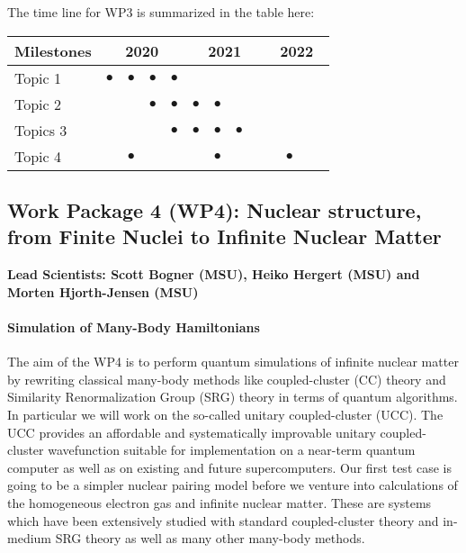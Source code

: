 \documentclass[10pt]{article}
\begin{document}
The time line for WP3 is summarized in the table here:
\begin{footnotesize}
\begin{center}
\begin{tabular}{|l|c|c|c|c|c|c|c|c|c|c|c|c|}
\hline
\multicolumn{1}{|l}{Milestones } & \multicolumn{4}{|c|}{ 2020 } & \multicolumn{4}{c|}{ 2021 } & \multicolumn{4}{c|}{ 2022 } \\
\hline
Topic 1 &$\bullet$ &$\bullet$ &$\bullet$ &$\bullet$ & & & & & & & &  \\
\hline
Topic 2 & & &$\bullet$ &$\bullet$ &$\bullet$ &$\bullet$ & & & & & &  \\
\hline
Topics 3 & & & & $\bullet$ &$\bullet$ &$\bullet$ &$\bullet$ & & & & &  \\
\hline
Topic 4 & &$\bullet$ & & & &$\bullet$ & & & &$\bullet$ & &  \\
\hline

\end{tabular}
\end{center}
\end{footnotesize}





\subsection{Work Package 4 (WP4): Nuclear structure, from Finite Nuclei to Infinite Nuclear Matter}
{\bf Lead Scientists: Scott Bogner (MSU), Heiko Hergert (MSU) and Morten Hjorth-Jensen (MSU)}
\paragraph{Simulation of Many-Body Hamiltonians}

The aim of the WP4 is to perform quantum simulations of infinite nuclear matter by rewriting classical many-body methods like coupled-cluster (CC) theory and Similarity Renormalization Group (SRG) theory in terms of quantum algorithms. In particular we will work on  the so-called unitary coupled-cluster (UCC). The UCC provides an affordable and systematically improvable unitary coupled-cluster wavefunction suitable for implementation on a near-term quantum computer as well as on existing and future supercomputers. Our first test case is going to be a simpler nuclear pairing model before we venture into calculations of the homogeneous electron gas and infinite nuclear matter. These are systems which have been extensively studied with standard coupled-cluster theory and in-medium SRG theory as well as many other many-body methods.  
\end{document}
